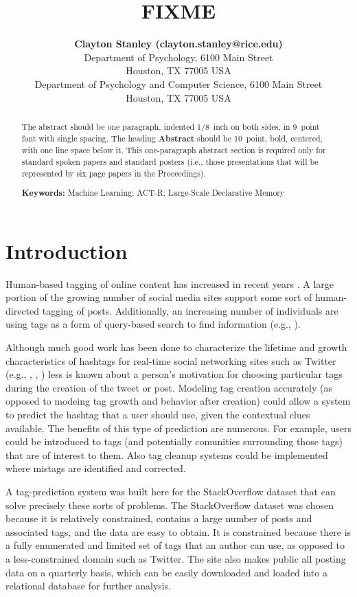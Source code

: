 \documentclass[10pt,letterpaper]{article}
\title{FIXME}
\author{{\large \bf Clayton Stanley (clayton.stanley@rice.edu)} \\
  Department of Psychology, 6100 Main Street \\
  Houston, TX 77005 USA 
  \AND {\large \bf Mike Byrne (byrne@rice.edu)} \\
  Department of Psychology and Computer Science, 6100 Main Street \\
  Houston, TX 77005 USA }
\begin{document}
\maketitle

\begin{abstract}
The abstract should be one paragraph, indented 1/8~inch on both sides,
in 9~point font with single spacing. The heading {\bf Abstract} should
be 10~point, bold, centered, with one line space below it. This
one-paragraph abstract section is required only for standard spoken
papers and standard posters (i.e., those presentations that will be
represented by six page papers in the Proceedings).

\textbf{Keywords:} 
Machine Learning; ACT-R; Large-Scale Declarative Memory
\end{abstract}

\section{Introduction}

Human-based tagging of online content has increased in recent years \cite{Chang2010}.
A large portion of the growing number of social media sites support some sort of human-directed tagging of posts.
Additionally, an increasing number of individuals are using tags as a form of query-based search to find information
(e.g., ).

Although much good work has been done to characterize the lifetime and growth characteristics of hashtags for real-time social networking sites such as Twitter
(e.g., , , )
less is known about a person's motivation for choosing particular tags during the creation of the tweet or post.
Modeling tag creation accurately (as opposed to modeing tag growth and behavior after creation) could allow a system to predict the hashtag that a user should use, given the contextual clues available.
The benefits of this type of prediction are numerous.
For example, users could be introduced to tags (and potentially comunities surrounding those tags) that are of interest to them.
Also tag cleanup systems could be implemented where mistags are identified and corrected.

A tag-prediction system was built here for the StackOverflow dataset that can solve precisely these sorts of problems.
The StackOverflow dataset was chosen because it is relatively constrained, contains a large number of posts and associated tags, and the data are easy to obtain.
It is constrained because there is a fully enumerated and limited set of tags that an author can use, as opposed to a less-constrained domain such as Twitter.
The site also makes public all posting data on a quarterly basis, which can be easily downloaded and loaded into a relational database for further analysis.
\end{document}
